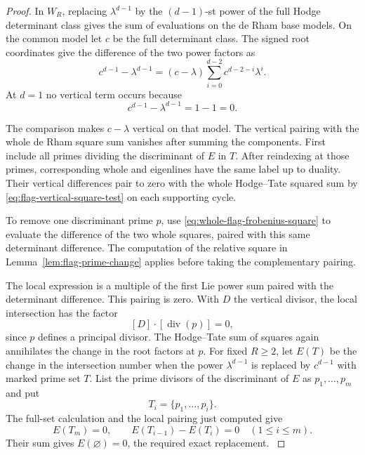\begin{proof}
In \(W_R\), replacing \(\lambda^{d-1}\) by the
\((d-1)\)-st power of the full Hodge determinant class
gives the sum of evaluations on the de Rham base models.
On the common model let \(c\) be the full determinant class.
The signed root coordinates give the difference of the two
power factors as
\[
 c^{d-1}-\lambda^{d-1}
    =(c-\lambda)\sum_{i=0}^{d-2}c^{d-2-i}\lambda^i .
\]
At \(d=1\) no vertical term occurs because
\[
 c^{d-1}-\lambda^{d-1}=1-1=0.
\]

The comparison makes \(c-\lambda\) vertical on that model. The vertical pairing with the
whole de Rham square sum vanishes after summing the
components. First include all primes dividing the discriminant of \(E\) in \(T\). After reindexing at those primes,
corresponding whole and eigenlines have the same label up to duality. Their vertical differences pair to zero
with the whole Hodge--Tate squared sum by
\eqref{eq:flag-vertical-square-test} on each supporting cycle.

To remove one discriminant prime \(p\), use
\eqref{eq:whole-flag-frobenius-square} to evaluate the difference of
the two whole squares, paired with this same determinant difference.
The computation of the relative square in Lemma~\ref{lem:flag-prime-change}
applies before taking the complementary pairing.

The local expression is a multiple
of the first Lie power sum paired with the determinant
difference. This pairing is zero. With \(D\) the vertical divisor, the local intersection has the factor
\[
 [D]\cdot[\operatorname{div}(p)]=0,
\]
since \(p\) defines a principal divisor. The Hodge--Tate sum of squares again
annihilates the change in the root factors at \(p\).
For fixed \(R\ge2\), let \(E(T)\) be the change in the intersection number when the power \(\lambda^{d-1}\) is replaced by \(c^{d-1}\) with marked prime set \(T\). List the prime divisors of the discriminant of \(E\) as \(p_1,\ldots,p_m\) and put
\[
 T_i=\{p_1,\ldots,p_i\}.
\]
The full-set calculation and the local pairing just computed give
\[
 E(T_m)=0,\qquad E(T_{i-1})-E(T_i)=0\quad(1\le i\le m).
\]
Their sum gives \(E(\varnothing)=0\), the required exact replacement.
\label{cor:covolume-flag-test-7}


\end{proof}
